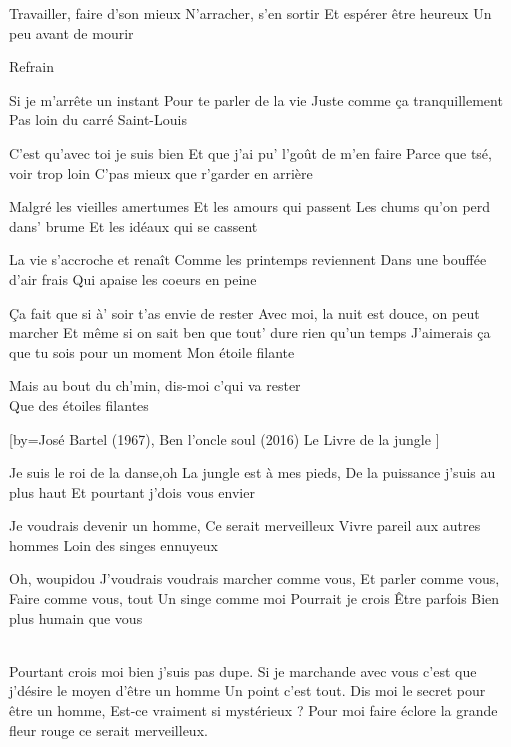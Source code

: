 \beginverse
Travailler, faire d'son mieux
N'arracher, s'en sortir
Et espérer être heureux
Un peu avant de mourir
\endverse

\beginverse
Refrain
\endverse

\beginverse
Si je m'arrête un instant
Pour te parler de la vie
Juste comme ça tranquillement
Pas loin du carré Saint-Louis
\endverse

\beginverse
C'est qu'avec toi je suis bien
Et que j'ai pu' l'goût de m'en faire
Parce que tsé, voir trop loin
C'pas mieux que r'garder en arrière
\endverse

\beginverse
Malgré les vieilles amertumes
Et les amours qui passent
Les chums qu'on perd dans' brume
Et les idéaux qui se cassent
\endverse

\beginverse
La vie s'accroche et renaît
Comme les printemps reviennent
Dans une bouffée d'air frais
Qui apaise les coeurs en peine
\endverse

\beginverse
Ça fait que si à' soir t'as envie de rester
Avec moi, la nuit est douce, on peut marcher
Et même si on sait ben que tout' dure rien qu'un temps
J'aimerais ça que tu sois pour un moment
Mon étoile filante
\endverse

\beginverse
Mais au bout du ch'min, dis-moi c'qui va rester \\[bis]
Que des étoiles filantes
\endverse

[by={José Bartel (1967), Ben l'oncle soul (2016) \- Le Livre de la jungle }]

\beginverse
Je suis le roi de la danse,oh
La jungle est à mes pieds,
De la puissance j'suis au plus haut
Et pourtant j'dois vous envier
\endverse

\beginverse
Je voudrais devenir un homme,
Ce serait merveilleux
Vivre pareil aux autres hommes
Loin des singes ennuyeux
\endverse

\beginverse
Oh, woupidou \!
J'voudrais voudrais marcher comme vous,
Et parler comme vous,
Faire comme vous, tout \!
Un singe comme moi
Pourrait je crois
Être parfois
Bien plus humain que vous \!
\endverse

\\[Scat]

\beginverse
Pourtant crois moi bien j'suis pas dupe.
Si je marchande avec vous
c'est que j'désire le moyen d'être un homme
Un point c'est tout.
Dis moi le secret pour être un homme,
Est-ce vraiment si mystérieux ?
Pour moi faire éclore la grande fleur rouge ce serait merveilleux.
\endverse

